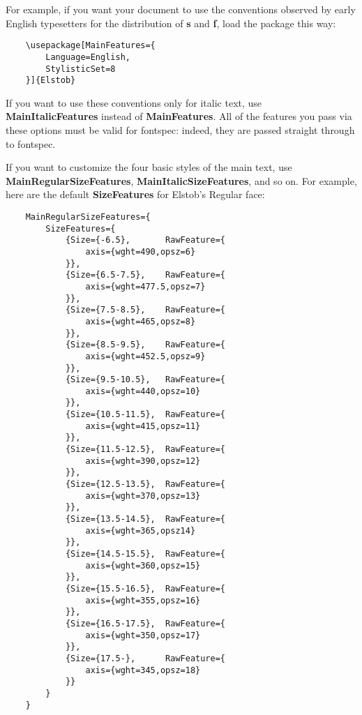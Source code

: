 \documentclass[12pt]{article}
\newcommand{\fspec}{{\sffamily fontspec}}
\begin{document}
For example, if you want your document to use the conventions observed by early
English typesetters for the distribution of \textbf{s} and \textbf{ſ}, load the
package this way:

\footnotesize
\begin{verbatim}
    \usepackage[MainFeatures={
        Language=English,
        StylisticSet=8
    }]{Elstob}
\end{verbatim}
\normalsize

\noindent If you want to use these conventions only for italic text, use
\textbf{MainItalicFeatures} instead of \textbf{MainFeatures}. All of the
features you pass via these options must be valid for \fspec: indeed,
they are passed straight through to \fspec.

If you want to customize the four basic styles of the main text, use
\textbf{MainRegularSizeFeatures}, \textbf{MainItalicSizeFeatures}, and so on.
For example, here are the default \textbf{SizeFeatures} for Elstob's 
Regular face:

\footnotesize
\begin{verbatim}
    MainRegularSizeFeatures={
        SizeFeatures={
            {Size={-6.5},       RawFeature={
                axis={wght=490,opsz=6}
            }},
            {Size={6.5-7.5},    RawFeature={
                axis={wght=477.5,opsz=7}
            }},
            {Size={7.5-8.5},    RawFeature={
                axis={wght=465,opsz=8}
            }},
            {Size={8.5-9.5},    RawFeature={
                axis={wght=452.5,opsz=9}
            }},
            {Size={9.5-10.5},   RawFeature={
                axis={wght=440,opsz=10}
            }},
            {Size={10.5-11.5},  RawFeature={
                axis={wght=415,opsz=11}
            }},
            {Size={11.5-12.5},  RawFeature={
                axis={wght=390,opsz=12}
            }},
            {Size={12.5-13.5},  RawFeature={
                axis={wght=370,opsz=13}
            }},
            {Size={13.5-14.5},  RawFeature={
                axis={wght=365,opsz14}
            }},
            {Size={14.5-15.5},  RawFeature={
                axis={wght=360,opsz=15}
            }},
            {Size={15.5-16.5},  RawFeature={
                axis={wght=355,opsz=16}
            }},
            {Size={16.5-17.5},  RawFeature={
                axis={wght=350,opsz=17}
            }},
            {Size={17.5-},      RawFeature={
                axis={wght=345,opsz=18}
            }}
        }
    }
\end{verbatim}\normalsize
\end{document}
